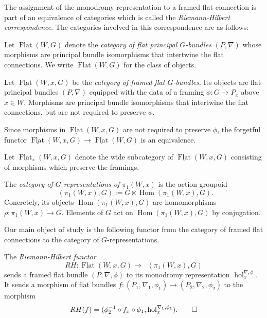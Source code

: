 \documentclass[10pt]{amsart}
\newcommand{\Hom}{\operatorname{Hom}}
\newcommand{\hol}{{\operatorname{hol}}}
\newcommand{\FlatCat}{{\underline{\operatorname{Flat}}}}
\newcommand{\FlatObj}{{\operatorname{Flat}}}
\DeclareMathOperator{\Rep}{\underline{\operatorname{Rep}}}
\numberwithin{theoremalpha}{section}
\numberwithin{equation}{section}
\numberwithin{definition}{section}
\numberwithin{theorem}{section}
\numberwithin{proposition}{section}
\numberwithin{lemma}{section}
\numberwithin{example}{section}
\numberwithin{remark}{section}
\numberwithin{corollary}{section}
\numberwithin{question}{section}
\numberwithin{problem}{section}
\numberwithin{assumption}{section}
\theoremstyle{named}
\numberwithin{equation}{section}
\begin{document}
The assignment of the monodromy representation to a framed flat connection is part of an equivalence of categories which is called the \emph{Riemann-Hilbert correspondence}. The categories involved in this correspondence are as follows:
\begin{definition}
Let $\FlatCat(W,G)$ denote the \emph{category of flat principal $G$-bundles} $(P, \nabla)$ whose morphisms are principal bundle isomorphisms that intertwine the flat connections. We write $\FlatObj(W,G)$ for the class of objects.
\end{definition}

\begin{definition}
Let $\FlatCat(W, x, G)$ be the \emph{category of framed flat $G$-bundles}. Its objects are flat principal bundles $(P, \nabla)$ equipped with the data of a framing $\phi : G \to P_{x}$ above $x \in W$. Morphisms are principal bundle isomorphisms that intertwine the flat connections, but are not required to preserve $\phi$.
\end{definition}
Since morphisms in $\FlatCat(W, x, G)$ are not required to preserve $\phi$, the forgetful functor $\FlatCat(W, x, G) \to \FlatCat(W,G)$ is an equivalence. 

\begin{definition}
Let $\FlatCat_{*}(W, x, G)$ denote the wide subcategory of $\FlatCat(W, x, G)$ consisting of morphisms which preserve the framings. 
\end{definition}

\begin{definition}
The \emph{category of $G$-representations of $\pi_{1}(W,x)$} is the action groupoid 
\[ \Rep(\pi_{1}(W, x), G) := G \ltimes \Hom(\pi_{1}(W, x), G). \]
Concretely, its objects $\Hom(\pi_{1}(W, x), G)$ are homomorphisms $\rho : \pi_{1}(W, x) \to G$. Elements of $G$ act on $\Hom(\pi_{1}(W, x), G)$ by conjugation.
\end{definition}

Our main object of study is the following functor from the category of framed flat connections to the category of $G$-representations. 
\begin{definition}
The \emph{Riemann-Hilbert functor}
\[ RH : \FlatCat(W, x, G) \to \Rep(\pi_{1}(W, x), G) \]
sends a framed flat bundle $(P, \nabla, \phi)$ to its monodromy representation $\hol_{x}^{\nabla, \phi}$. It sends a morphism of flat bundles $f: (P_{1}, \nabla_{1}, \phi_{1}) \to (P_{2}, \nabla_{2}, \phi_{2})$ to the morphism
\[ RH(f) = (\phi_{2}^{-1} \circ f_{x} \circ \phi_{1}, \hol_{x}^{\nabla_{1}, \phi_{1}}). \qedhere \]
\end{definition}
\end{document}
